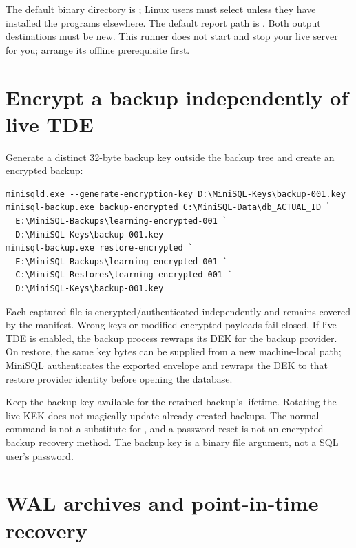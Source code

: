 The default binary directory is ; Linux users must select
 unless they have installed the programs elsewhere.
The default report path is .
Both output destinations must be new. This runner does not start and stop
your live server for you; arrange its offline prerequisite first.


\section{Encrypt a backup independently of live TDE}

Generate a distinct 32-byte backup key outside the backup tree and create an
encrypted backup:

\begin{lstlisting}
minisqld.exe --generate-encryption-key D:\MiniSQL-Keys\backup-001.key
minisql-backup.exe backup-encrypted C:\MiniSQL-Data\db_ACTUAL_ID `
  E:\MiniSQL-Backups\learning-encrypted-001 `
  D:\MiniSQL-Keys\backup-001.key
minisql-backup.exe restore-encrypted `
  E:\MiniSQL-Backups\learning-encrypted-001 `
  C:\MiniSQL-Restores\learning-encrypted-001 `
  D:\MiniSQL-Keys\backup-001.key
\end{lstlisting}

Each captured file is encrypted/authenticated independently and remains
covered by the manifest. Wrong keys or modified encrypted payloads fail
closed. If live TDE is enabled, the backup process rewraps its DEK for the
backup provider. On restore, the same key bytes can be supplied from a new
machine-local path; MiniSQL authenticates the exported envelope and rewraps
the DEK to that restore provider identity before opening the database.

Keep the backup key available for the retained backup's lifetime. Rotating the
live KEK does not magically update already-created backups. The normal
 command is not a substitute for ,
and a password reset is not an encrypted-backup recovery method. The backup
key is a binary file argument, not a SQL user's password.


\section{WAL archives and point-in-time recovery}


